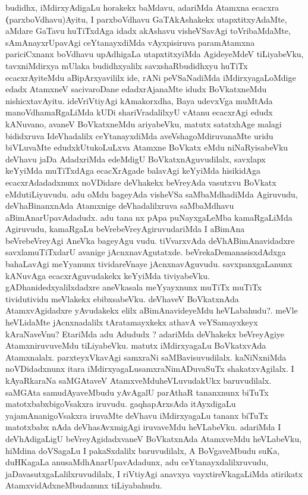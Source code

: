 \begin{artha}
budidhx, iMdirxyAdigaLu horakekx baMdavu, adariMda Atamxna ecacxra
\textbf(parxboVdhavu)Ayitu, I parxboVdhavu GaTAkAshakekx
utapxtitxyAdaMte, aMdare GaTavu huTiTxdAga idadx akAshavu visheVSavAgi
toVribaMdaMte, sAmAnayxrUpavAgi ceYtanayxdiMda vAyxpisiruva
paramAtamxna pariciCxnanx boVdhavu upAdhigaLa utapxtitxyiMda
AgideyeMdeV tiLiyabeVku,  tavxniMdirxya mUlaka budidhxyalilx
savxshaRbudidhxyu huTiTx ecacxrAyiteMdu aBipArxyavililx ide, rANi
peVSaNadiMda iMdirxyagaLoMdige edadx AtamxneV sacivaroDane
edadxrAjanaMte idudx BoVkatxneMdu nishicxtavAyitu. ideVriVtiyAgi
kAmakorxdha, Baya udevxVga muMtAda manoVdhamaRgaLiMda kUDi
shariVradalilxyU  vAtanu ecacxrAgi edudx kANuvano, avaneV BoVkatxneMdu
ariyabeVku, matutx satatxhAge malagi bididxruva IdeVhadalilx
ceYtanayxdiMda aveVshagoMdiruvanaMte uridu biVLuvaMte
edudxkUtukoLuLxva Atamxne BoVkatx eMdu niNaRyisabeVku deVhavu
jaDa AdadxriMda edeMdigU BoVkatxnAguvudilalx, savxlapx keYyiMda
muTiTxdAga ecacXrAgade balavAgi keYyiMda hisikidAga ecacxrAdadadxnunx
noVDidare deVhakekx beVreyAda vasutxvu BoVkatx eMdutiLiyuvudu. adu
oMdu bageyAda visheVSa saMbaMdhadiMda Agiruvudu, deVhaBinanxnAda
Atamxnige deVhadalilxruva saMbaMdhavu aBimAnarUpavAdadudx. adu tana
nx pApa puNayxgaLeMba kamaRgaLiMda Agiruvudu, kamaRgaLu
beVrebeVreyAgiruvudariMda I aBimAna beVrebeVreyAgi AneVka
bageyAgu	vudu. tiVvarxvAda deVhABimAnavidadxre savxlamuTiTxdarU avanige
jAcnxnavAgutatxde. beVrekaDemanasisxdAdxga bahaLavAgi meYyanunx
tividareVnaye jAcnxnavAguvudu. savxpanxgaLanunx kANuvAga
ecacxrAguvudakekx keYyiMda tiviyabeVku. gADhanidedxyalilxdadxre
aneVkasala meYyayxnunx muTiTx muTiTx tividutividu meVlakekx
ebibxsabeVku. deVhaveV BoVkatxnAda AtamxvAgidadxre yAvudakekx elilx
aBimAnavideyeMdu heVLabahudu?. meVle heVLidaMte jAcnxnadalilx
tAratamayxkekx athavA veYSamayxkeyx kAraNaveVnu? EtariMda adu Adududx
? adariMda deVhakekx beVreyAgiye AtamxniruvuveMdu tiLiyabeVku. matutx
iMdirxyagaLu BoVkatxvAda Atamxnalalx. parxteyxVkavAgi samxraNi
saMBavisuvudilalx. kaNiNxniMda noVDidadxnunx itara
iMdirxyagaLusamxraNimADuvaSuTx shakatxvAgilalx. I kAyaRkaraNa
saMGAtaveV AtamxveMduheVLuvudakUkx baruvudilalx. saMGAta
samudAyaveMbudu yAvAgalU parAthaR tananxnunx biTuTx
matotxbabxbigoVsakxra iruvudu. gaqhapArxsAda itAyxdigaLu
yajamAnanigoVsakxra iruvaMte deVhavu iMdirxyagaLu tananx biTuTx
matotxbabx nAda deVhasAvxmigAgi iruvaveMdu heVLabeVku. adariMda I
deVhAdigaLigU beVreyAgidadxvaneV BoVkatxnAda AtamxveMdu heVLabeVku,
hiMdina doVSagaLu I pakaSxdalilx baruvudilalx, A BoVgaveMbudu suKa,
duHKagaLa anusaMdhAnarUpavAdadunx, adu ceYtanayxdalilxruvudu,
jaDavasutxgaLalilxruvudilalx, I riVtiyAgi anavxya vayxtireVkagaLiMda
atirikatx AtamxvidAdxneMbudanunx tiLiyabahudu.
\end{artha}

